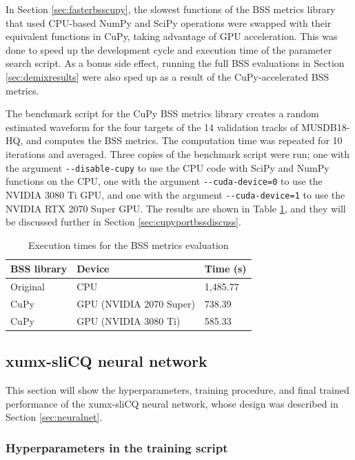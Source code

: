 \documentclass[report.tex]{subfiles}
\begin{document}
In Section \ref{sec:fasterbsscupy}, the slowest functions of the BSS metrics library that used CPU-based NumPy and SciPy operations were swapped with their equivalent functions in CuPy, taking advantage of GPU acceleration. This was done to speed up the development cycle and execution time of the parameter search script. As a bonus side effect, running the full BSS evaluations in Section \ref{sec:demixresults} were also sped up as a result of the CuPy-accelerated BSS metrics.

The benchmark script for the CuPy BSS metrics library creates a random estimated waveform for the four targets of the 14 validation tracks of MUSDB18-HQ, and computes the BSS metrics. The computation time was repeated for 10 iterations and averaged. Three copies of the benchmark script were run; one with the argument \Verb#--disable-cupy# to use the CPU code with SciPy and NumPy functions on the CPU, one with the argument \Verb#--cuda-device=0# to use the NVIDIA 3080 Ti GPU, and one with the argument \Verb#--cuda-device=1# to use the NVIDIA RTX 2070 Super GPU. The results are shown in Table \ref{table:cupybssresults}, and they will be discussed further in Section \ref{sec:cupyportbssdiscuss}.

\begin{table}[ht]
	\centering
	\caption{Execution times for the BSS metrics evaluation}
	\label{table:cupybssresults}
	\begin{tabular}{ |l|l|l| }
	 \hline
		BSS library & Device & Time (s) \\
	 \hline
	 \hline
		Original & CPU & 1,485.77  \\
	 \hline
		CuPy & GPU (NVIDIA 2070 Super) & 738.39 \\
	 \hline
		CuPy & GPU (NVIDIA 3080 Ti) &  585.33 \\
	 \hline
\end{tabular}
\end{table}

\newpagefill

\subsection{xumx-sliCQ neural network}
\label{sec:nnresults}

This section will show the hyperparameters, training procedure, and final trained performance of the xumx-sliCQ neural network, whose design was described in Section \ref{sec:neuralnet}.

\subsubsection{Hyperparameters in the training script}
\label{sec:hyperparams}
\end{document}
